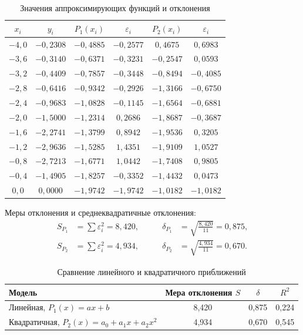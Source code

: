 \documentclass[12pt,a4paper]{article}
\begin{document}
\begin{table}[H]
    \centering
    \small
    \caption{Значения аппроксимирующих функций и отклонения}
    \begin{tabular}{cccccc}
        \toprule
        $x_i$ & $y_i$ & $P_1(x_i)$ & $\varepsilon_i$ & $P_2(x_i)$ & $\varepsilon_i$\\
        \midrule
        $-4{,}0$ & $-0{,}2308$ & $-0{,}4885$ & $-0{,}2577$ & $0{,}4675$ & $0{,}6983$\\
        $-3{,}6$ & $-0{,}3140$ & $-0{,}6371$ & $-0{,}3231$ & $-0{,}2547$ & $0{,}0593$\\
        $-3{,}2$ & $-0{,}4409$ & $-0{,}7857$ & $-0{,}3448$ & $-0{,}8494$ & $-0{,}4085$\\
        $-2{,}8$ & $-0{,}6416$ & $-0{,}9342$ & $-0{,}2926$ & $-1{,}3166$ & $-0{,}6750$\\
        $-2{,}4$ & $-0{,}9683$ & $-1{,}0828$ & $-0{,}1145$ & $-1{,}6564$ & $-0{,}6881$\\
        $-2{,}0$ & $-1{,}5000$ & $-1{,}2314$ & $0{,}2686$ & $-1{,}8687$ & $-0{,}3687$\\
        $-1{,}6$ & $-2{,}2741$ & $-1{,}3799$ & $0{,}8942$ & $-1{,}9536$ & $0{,}3205$\\
        $-1{,}2$ & $-2{,}9636$ & $-1{,}5285$ & $1{,}4351$ & $-1{,}9109$ & $1{,}0527$\\
        $-0{,}8$ & $-2{,}7213$ & $-1{,}6771$ & $1{,}0442$ & $-1{,}7408$ & $0{,}9805$\\
        $-0{,}4$ & $-1{,}4905$ & $-1{,}8257$ & $-0{,}3352$ & $-1{,}4432$ & $0{,}0473$\\
        $0{,}0$ & $0{,}0000$ & $-1{,}9742$ & $-1{,}9742$ & $-1{,}0182$ & $-1{,}0182$\\
        \bottomrule
    \end{tabular}
\end{table}

Меры отклонения и среднеквадратичные отклонения:
\[
\begin{aligned}
    S_{P_1}&=\sum \varepsilon_i^2=8{,}420, &\qquad \delta_{P_1}&=\sqrt{\frac{8{,}420}{11}}=0{,}875,\\
    S_{P_2}&=\sum \varepsilon_i^2=4{,}934, &\qquad \delta_{P_2}&=\sqrt{\frac{4{,}934}{11}}=0{,}670 .
\end{aligned}
\]

\begin{table}[H]
    \centering
    \caption{Сравнение линейного и квадратичного приближений}
    \begin{tabular}{>{\raggedright\arraybackslash}p{5.1cm}ccc}
        \toprule
        Модель & Мера отклонения $S$ & $\delta$ & $R^2$\\
        \midrule
        Линейная, $P_1(x)=ax+b$ & 8,420 & 0,875 & 0,224\\
        Квадратичная, $P_2(x)=a_0+a_1x+a_2x^2$ & 4,934 & 0,670 & 0,545\\
        \bottomrule
    \end{tabular}
\end{table}
\end{document}
